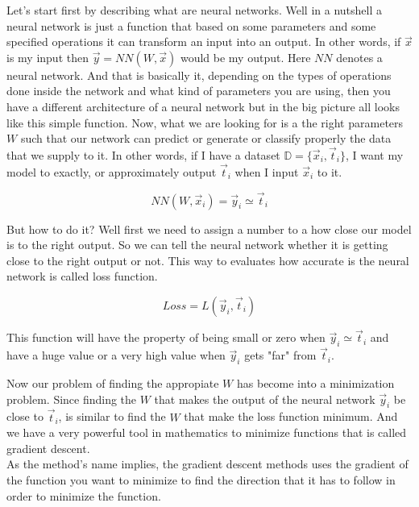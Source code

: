 \documentclass[english,preprint,JIP]{ipsj}
\begin{document}
Let's start first by describing what are neural networks. Well in a nutshell a
neural network is just a function that based on some parameters and some
specified operations it can transform an input into an output. In other words,
if $\vec{x}$ is my input then $\vec{y} = NN(W,\vec{x})$ would be my output. Here
$NN$ denotes a neural network. And that is basically it, depending on the types
of operations done inside the network and what kind of parameters you are using,
then you have a different architecture of a neural network but in the big
picture all looks like this simple function. Now, what we are looking for is a
the right parameters $W$ such that our network can predict or generate or
classify properly the data that we supply to it. In other words, if I have a
dataset $\mathbb{D} = \{\vec{x}_i,\vec{t}_i\}$, I want my model to exactly, or
approximately output $\vec{t}_i$ when I input $\vec{x}_i$ to it.

\begin{equation}
    NN(W,\vec{x}_i) = \vec{y}_i \simeq \vec{t}_i
\end{equation}

But how to do it? Well first we need to assign a number to a how close our model
is to the right output. So we can tell the neural network whether it is getting
close to the right output or not. This way to evaluates how accurate is the
neural network is called loss function.

\begin{equation}
    Loss = L(\vec{y}_i,\vec{t}_i)
\end{equation}

This function will have the property of being small or zero when $\vec{y}_i
    \simeq \vec{t}_i$ and have a huge value or a very high value when $\vec{y}_i$
gets "far" from $\vec{t}_i$.

Now our problem of finding the appropiate $W$ has become into a minimization
problem. Since finding the $W$ that makes the output of the neural network
$\vec{y}_i$ be close to $\vec{t}_i$, is similar to find the $W$ that make the
loss function minimum. And we have a very powerful tool in mathematics to
minimize functions that is called gradient descent.\\

As the method's name implies, the gradient descent methods uses the gradient of
the function you want to minimize to find the direction that it has to follow in
order to minimize the function.\\
\end{document}
